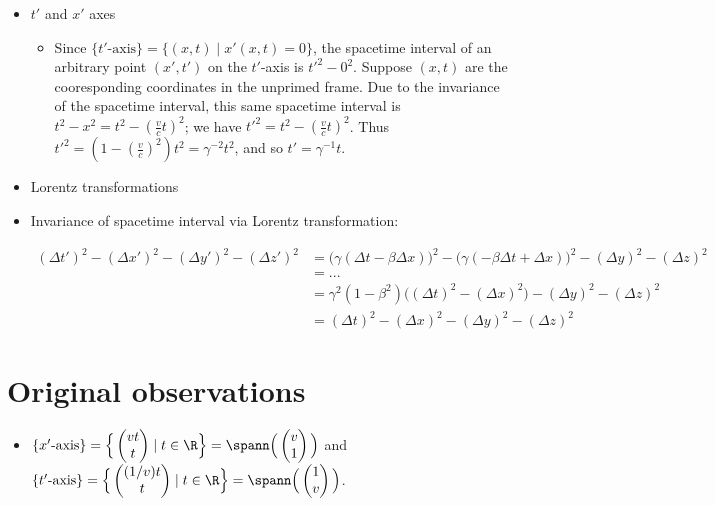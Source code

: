 \begin{itemize}
\begin{itemize}
\begin{itemize}
		\end{itemize}
	\end{itemize}
	\item $t'$ and $x'$ axes
	\begin{itemize}
		\item Since $\{\text{$t'$-axis}\} = \{(x, t) \mid x'(x, t) = 0\}$, the spacetime interval of an arbitrary point $(x', t')$ on the $t'$-axis is $t'^2 - 0^2$. Suppose $(x, t)$ are the cooresponding coordinates in the unprimed frame. Due to the invariance of the spacetime interval, this same spacetime interval is $t^2 - x^2 = t^2 - (\frac{v}{c}t)^2$; we have $t'^2 = t^2 - (\frac{v}{c}t)^2$. Thus $t'^2 = (1 - (\frac{v}{c})^2)t^2 = \gamma^{-2} t^2$, and so $t' = \gamma^{-1} t$.        
	\end{itemize}
	\item Lorentz transformations
	\item Invariance of spacetime interval via Lorentz transformation:
	\begin{itemize}
		\begin{align*}
			(\Delta t')^2 - (\Delta x')^2 - (\Delta y')^2 - (\Delta z')^2
			&= \Big(\gamma(\Delta t - \beta \Delta x)\Big)^2 - \Big(\gamma(-\beta \Delta t + \Delta x)\Big)^2 - (\Delta y)^2 - (\Delta z)^2 \\
			&= ... \\
			&= \gamma^2 (1 - \beta^2)\Big((\Delta t)^2 - (\Delta x)^2\Big) - (\Delta y)^2 - (\Delta z)^2 \\
			&= (\Delta t)^2 - (\Delta x)^2 - (\Delta y)^2 - (\Delta z)^2 
		\end{align*}
	\end{itemize}
\end{itemize}

\section*{Original observations}

\begin{itemize}
	\item $\{\text{$x'$-axis}\} = \Big\{ \begin{pmatrix} vt \\ t \end{pmatrix} \mid t \in \R \Big\} = \spann\Big(\begin{pmatrix} v \\ 1 \end{pmatrix}\Big)$ and $\{\text{$t'$-axis}\} = \Big\{ \begin{pmatrix} (1/v)t \\ t \end{pmatrix} \mid t \in \R \Big\} = \spann\Big( \begin{pmatrix} 1 \\ v \end{pmatrix} \Big)$.
\end{itemize}

